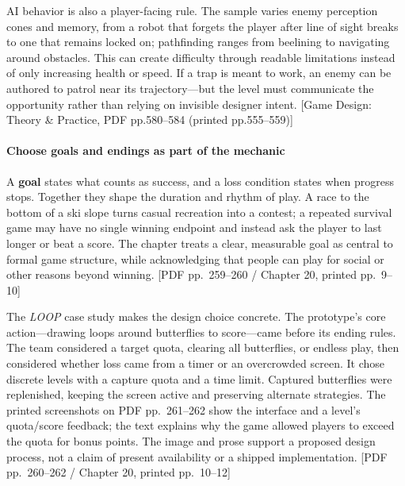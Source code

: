 AI behavior is also a player-facing rule. The sample varies enemy perception cones and memory, from a robot that forgets the player after line of sight breaks to one that remains locked on; pathfinding ranges from beelining to navigating around obstacles. This can create difficulty through readable limitations instead of only increasing health or speed. If a trap is meant to work, an enemy can be authored to patrol near its trajectory---but the level must communicate the opportunity rather than relying on invisible designer intent. {[}Game Design: Theory \& Practice, PDF pp.580--584 (printed pp.555--559){]}

\paragraph{Choose goals and endings as part of the mechanic}\label{05-engine-i-ch009-choose-goals-and-endings-as-part-of-the-mechanic}

\hypertarget{05-engine-i-ch009-choose-goals-and-endings-as-part-of-the-mechanic}{}

A \textbf{goal} states what counts as success, and a loss condition states when progress stops. Together they shape the duration and rhythm of play. A race to the bottom of a ski slope turns casual recreation into a contest; a repeated survival game may have no single winning endpoint and instead ask the player to last longer or beat a score. The chapter treats a clear, measurable goal as central to formal game structure, while acknowledging that people can play for social or other reasons beyond winning. {[}PDF pp.~259--260 / Chapter 20, printed pp.~9--10{]}

The \emph{LOOP} case study makes the design choice concrete. The prototype's core action---drawing loops around butterflies to score---came before its ending rules. The team considered a target quota, clearing all butterflies, or endless play, then considered whether loss came from a timer or an overcrowded screen. It chose discrete levels with a capture quota and a time limit. Captured butterflies were replenished, keeping the screen active and preserving alternate strategies. The printed screenshots on PDF pp.~261--262 show the interface and a level's quota/score feedback; the text explains why the game allowed players to exceed the quota for bonus points. The image and prose support a proposed design process, not a claim of present availability or a shipped implementation. {[}PDF pp.~260--262 / Chapter 20, printed pp.~10--12{]}

